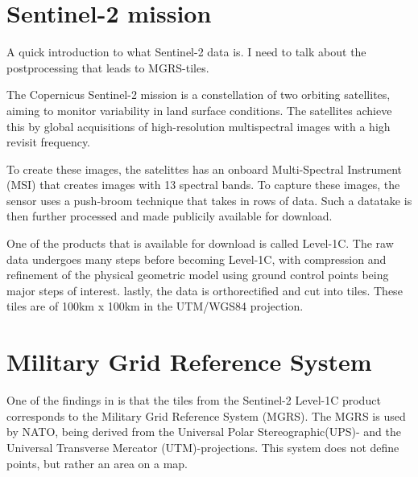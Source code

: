 




\section{Sentinel-2 mission}
\begin{info}{}
	A quick introduction to what Sentinel-2 data is. 
	I need to talk about the postprocessing that leads to MGRS-tiles.  
\end{info}
The Copernicus Sentinel-2 mission is a constellation of two orbiting satellites, aiming to monitor variability in land surface conditions. \cite{EuropeanSpaceAgency}
The satellites achieve this by global acquisitions of high-resolution multispectral images with a high revisit frequency.

To create these images, the satelittes has an onboard Multi-Spectral Instrument (MSI) that creates images with 13 spectral bands. To capture these images, the sensor uses a push-broom technique that takes in rows of data. Such a datatake is then further processed and made publicily available for download. 

One of the products that is available for download is called Level-1C. The raw data undergoes many steps before becoming Level-1C, with compression and refinement of the physical geometric model using ground control points being major steps of interest. lastly, the data is orthorectified and cut into tiles. These tiles are of 100km x 100km in the UTM/WGS84 projection.

\section{Military Grid Reference System}
\begin{info}{}

\end{info}

One of the findings in \cite{Tofting2018} is that the tiles from the Sentinel-2 Level-1C product corresponds to the Military Grid Reference System (MGRS). The MGRS is used by NATO, being derived from the Universal Polar Stereographic(UPS)- and the Universal Transverse Mercator (UTM)-projections. This system does not define points, but rather an area on a map. 

